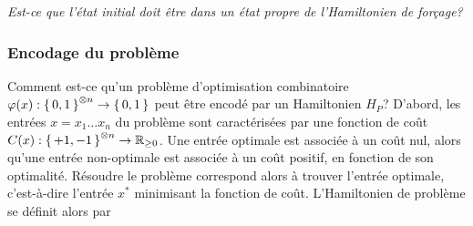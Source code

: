 \textcolor{mydarkred}{\textit{Est-ce que l'état initial doit être dans un état propre de l'Hamiltonien de forçage?}}


\subsubsection{Encodage du problème}
\label{subsec:encodage-probleme}

Comment est-ce qu'un problème d'optimisation combinatoire $\varphi(x):\set{ 0, 1 }^{\otimes n} \to \set{ 0, 1 }$ peut être encodé par un Hamiltonien $H_{P}$? D'abord, les entrées $x = x_{1} \dots x_{n}$ du problème sont caractérisées par une fonction de coût $C(x):\set{ +1, -1 }^{\otimes n} \to \mathbb{R}_{\geq 0}$. Une entrée optimale est associée à un coût nul, alors qu'une entrée non-optimale est associée à un coût positif, en fonction de son optimalité. Résoudre le problème correspond alors à trouver l'entrée optimale, c'est-à-dire l'entrée $x^{*}$ minimisant la fonction de coût. L'Hamiltonien de problème se définit alors par

